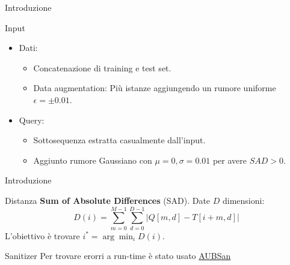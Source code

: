 \begin{frame}{Introduzione}
    \begin{block}{Input}
        \begin{itemize}
            \item Dati:
            \begin{itemize}
                \item Concatenazione di training e test set.
                \item Data augmentation: Più istanze aggiungendo un rumore uniforme $\epsilon=\pm0.01$.
            \end{itemize}
            \item Query:
            \begin{itemize}
                \item Sottosequenza estratta casualmente dall'input.
                \item Aggiunto rumore Gaussiano con $\mu=0, \sigma=0.01$ per avere $SAD>0$.
            \end{itemize}
        \end{itemize}
    \end{block}
\end{frame}

\begin{frame}{Introduzione}
    \begin{block}{Distanza}
        \textbf{Sum of Absolute Differences} (SAD). Date $D$ dimensioni:
        \begin{equation*}
            D(i) = \sum_{m=0}^{M-1} \sum_{d=0}^{D-1} |Q[m, d] - T[i+m, d]|
        \end{equation*}
        L'obiettivo è trovare $i^* = \displaystyle\arg\min_i D(i)$.
    \end{block}
    \begin{block}{Sanitizer}
        Per trovare erorri a run-time è stato usato \href{https://github.com/edoardosarri24/time-series-pattern-recognition/blob/3544216290ac2ef624417e489b20ebed9bae3b58/exec/AUBsanitizer.sh}{AUBSan}
    \end{block}
\end{frame}
